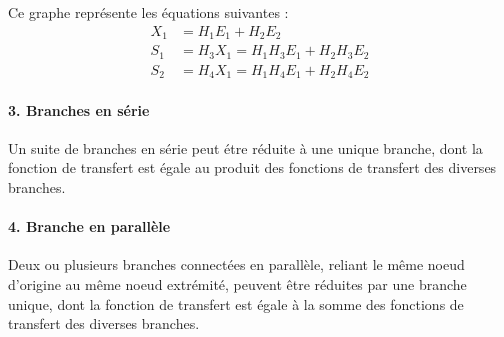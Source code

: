 Ce graphe représente les équations suivantes :
\begin{align*}
    X_1&=H_1E_1+H_2E_2\\
    S_1&=H_3X_1=H_1H_3E_1+H_2H_3E_2\\
    S_2&=H_4X_1=H_1H_4E_1+H_2H_4E_2
\end{align*}


\paragraph{3. Branches en série}
Un suite de branches en série peut étre réduite à une unique branche, dont la 
fonction de transfert est égale au produit des fonctions de transfert des 
diverses branches.

\begin{center}
\end{center}


\paragraph{4. Branche en parallèle}
Deux ou plusieurs branches connectées en parallèle, reliant le même noeud 
d'origine au même noeud extrémité, peuvent être réduites par une branche 
unique, dont la fonction de transfert est égale à la somme des fonctions de 
transfert des diverses branches. 

\begin{center}
\end{center}

